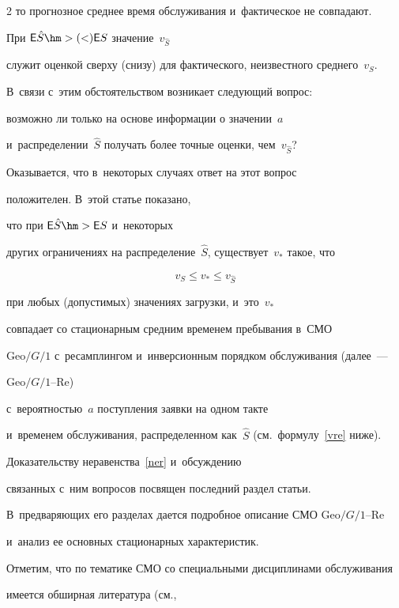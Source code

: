 \begin{multicols}{2}
то прогнозное среднее время обслуживания и~фактическое не совпадают.

При $\mathsf{E}{\hat S}\hm>(<)\mathsf{E}{S}$ значение~$v_{\hat S}$

служит оценкой сверху (снизу) для фактического, неизвестного среднего~$v_{S}$.

В~связи с~этим обстоятельством возникает следующий вопрос:

возможно ли только на основе информации о значении~$a$

и~распределении~$\hat{S}$ получать более точные оценки, чем~$v_{\hat S}$?

Оказывается, что в~некоторых случаях ответ на этот вопрос

положителен. В~этой статье показано,

что при $\mathsf{E}{\hat S}\hm>\mathsf{E}{S}$ и~некоторых

других ограничениях на распределение~$\hat{S}$, существует~$v_*$ такое, что

\begin{equation}

\label{ner}

v_{S} \le v_* \le v_{\hat S}

\end{equation}

при любых (допустимых) значениях загрузки, и~это~$v_*$

совпадает со стационарным средним временем пребывания в~СМО

$\mathrm{Geo}/G/1$ с~ресамплингом и~инверсионным порядком обслуживания (далее~--- 

$\mathrm{Geo}/G/1$--Re)

с~вероятностью~$a$ поступления заявки на одном такте

и~временем обслуживания, распределенном как~${\hat S}$ (см.\ формулу~\eqref{vre} ниже).

Доказательству неравенства~\eqref{ner} и~обсуждению

связанных с~ним вопросов посвящен последний раздел статьи.

В~предваряющих его разделах дается подробное описание СМО $\mathrm{Geo}/G/1$--Re

и~анализ ее основных стационарных характеристик.



Отметим, что по тематике СМО со специальными дисциплинами обслуживания

имеется обширная литература (см., 


\end{multicols}
